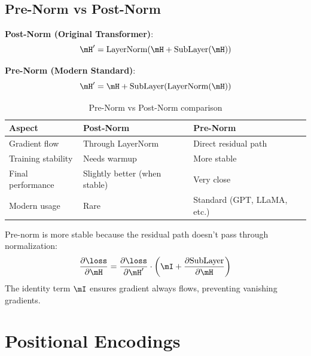 \subsection{Pre-Norm vs Post-Norm}

\textbf{Post-Norm (Original Transformer)}:
\begin{equation}
\mH' = \text{LayerNorm}(\mH + \text{SubLayer}(\mH))
\end{equation}

\textbf{Pre-Norm (Modern Standard)}:
\begin{equation}
\mH' = \mH + \text{SubLayer}(\text{LayerNorm}(\mH))
\end{equation}

\begin{table}[H]
\centering
\caption{Pre-Norm vs Post-Norm comparison}
\begin{tabularx}{\textwidth}{lXX}
\toprule
\textbf{Aspect} & \textbf{Post-Norm} & \textbf{Pre-Norm} \\
\midrule
Gradient flow & Through LayerNorm & Direct residual path \\
Training stability & Needs warmup & More stable \\
Final performance & Slightly better (when stable) & Very close \\
Modern usage & Rare & Standard (GPT, LLaMA, etc.) \\
\bottomrule
\end{tabularx}
\end{table}

\begin{keyinsight}
Pre-norm is more stable because the residual path doesn't pass through normalization:
\begin{equation}
\frac{\partial \loss}{\partial \mH} = \frac{\partial \loss}{\partial \mH'} \cdot \left(\mI + \frac{\partial \text{SubLayer}}{\partial \mH}\right)
\end{equation}
The identity term $\mI$ ensures gradient always flows, preventing vanishing gradients.
\end{keyinsight}

\section{Positional Encodings}
\label{sec:positional}

